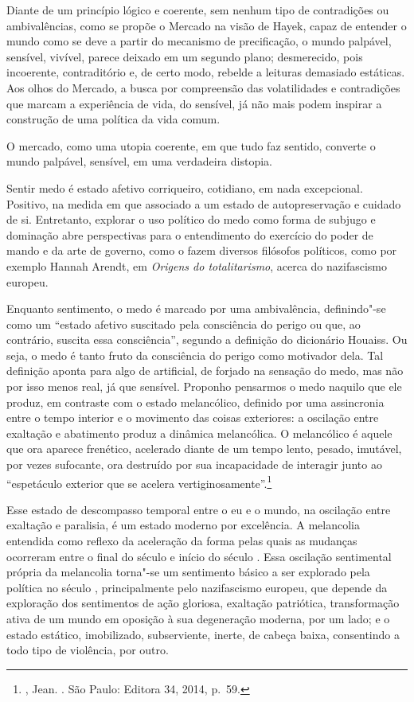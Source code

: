 Diante de um princípio lógico e coerente, sem nenhum tipo de
contradições ou ambivalências, como se propõe o Mercado na visão de
Hayek, capaz de entender o mundo como se deve a partir do mecanismo de
precificação, o mundo palpável, sensível, vivível, parece deixado em um
segundo plano; desmerecido, pois incoerente, contraditório e, de certo
modo, rebelde a leituras demasiado estáticas. Aos olhos do Mercado, a
busca por compreensão das volatilidades e contradições que marcam a
experiência de vida, do sensível, já não mais podem inspirar a
construção de uma política da vida comum.

O mercado, como uma utopia coerente, em que tudo faz sentido, converte o
mundo palpável, sensível, em uma verdadeira distopia.

\asterisc

Sentir medo é estado afetivo corriqueiro, cotidiano, em nada
excepcional. Positivo, na medida em que associado a um estado de
autopreservação e cuidado de si. Entretanto, explorar o uso político do
medo como forma de subjugo e dominação abre perspectivas para o
entendimento do exercício do poder de mando e da arte de governo, como o
fazem diversos filósofos políticos, como por exemplo Hannah Arendt, em
\emph{Origens do totalitarismo}, acerca do nazifascismo europeu.

Enquanto sentimento, o medo é marcado por uma ambivalência,
definindo"-se como um ``estado afetivo suscitado pela consciência do
perigo ou que, ao contrário, suscita essa consciência'', segundo a
definição do dicionário Houaiss. Ou seja, o medo é tanto fruto da
consciência do perigo como motivador dela. Tal definição aponta para
algo de artificial, de forjado na sensação do medo, mas não por isso
menos real, já que sensível. Proponho pensarmos o medo naquilo que ele
produz, em contraste com o estado melancólico, definido por uma
assincronia entre o tempo interior e o movimento das coisas exteriores:
a oscilação entre exaltação e abatimento produz a dinâmica melancólica.
O melancólico é aquele que ora aparece frenético, acelerado diante de um
tempo lento, pesado, imutável, por vezes sufocante, ora destruído por
sua incapacidade de interagir junto ao ``espetáculo exterior que se
acelera vertiginosamente''.\footnote{, Jean. {}. São Paulo: Editora 34, 2014, p.~59.}

Esse estado de descompasso temporal entre o eu e o mundo, na oscilação
entre exaltação e paralisia, é um estado moderno por excelência. A
melancolia entendida como reflexo da aceleração da forma pelas quais as
mudanças ocorreram entre o final do século  e início do século .
Essa oscilação sentimental própria da melancolia torna"-se um sentimento
básico a ser explorado pela política no século , principalmente pelo
nazifascismo europeu, que depende da exploração dos sentimentos de ação
gloriosa, exaltação patriótica, transformação ativa de um mundo em
oposição à sua degeneração moderna, por um lado; e o estado estático,
imobilizado, subserviente, inerte, de cabeça baixa, consentindo a todo
tipo de violência, por outro.

